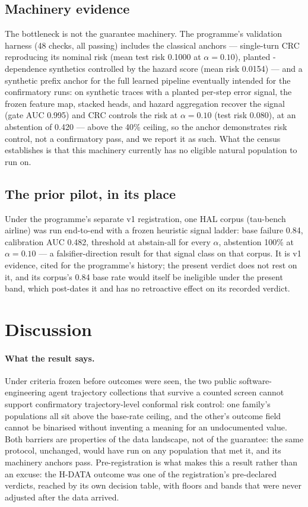 \documentclass[11pt]{article}
\begin{document}
\subsection{Machinery evidence}

The bottleneck is not the guarantee machinery. The programme's
validation harness (48 checks, all passing) includes the
classical anchors --- single-turn CRC reproducing its nominal
risk (mean test risk 0.1000 at $\alpha = 0.10$), planted
-dependence synthetics controlled by the hazard score (mean
risk 0.0154) --- and a synthetic prefix anchor for the full
learned pipeline eventually intended for the confirmatory runs:
on synthetic traces with a planted per-step error signal, the
frozen feature map, stacked heads, and hazard aggregation
recover the signal (gate AUC 0.995) and CRC controls the risk
at $\alpha = 0.10$ (test risk 0.080), at an abstention of
0.420 --- above the 40\% ceiling, so the anchor demonstrates
risk control, not a confirmatory pass, and we report it as
such. What the census establishes is that this machinery
currently has no eligible natural population to run on.

\subsection{The prior pilot, in its place}

Under the programme's separate v1 registration, one HAL corpus
(tau-bench airline) was run end-to-end with a frozen heuristic
signal ladder: base failure 0.84, calibration AUC 0.482,
threshold at abstain-all for every $\alpha$, abstention 100\%
at $\alpha = 0.10$ --- a falsifier-direction result for that
signal class on that corpus. It is v1 evidence, cited for the
programme's history; the present verdict does not rest on it,
and its corpus's 0.84 base rate would itself be ineligible
under the present band, which post-dates it and has no
retroactive effect on its recorded verdict.

\section{Discussion}

\paragraph{What the result says.} Under criteria frozen before
outcomes were seen, the two public software-engineering agent
trajectory collections that survive a counted screen cannot
support confirmatory trajectory-level conformal risk control:
one family's populations all sit above the base-rate ceiling,
and the other's outcome field cannot be binarised without
inventing a meaning for an undocumented value. Both barriers
are properties of the data landscape, not of the guarantee:
the same protocol, unchanged, would have run on any population
that met it, and its machinery anchors pass. Pre-registration
is what makes this a result rather than an excuse: the H-DATA
outcome was one of the registration's pre-declared verdicts,
reached by its own decision table, with floors and bands that
were never adjusted after the data arrived.
\end{document}
